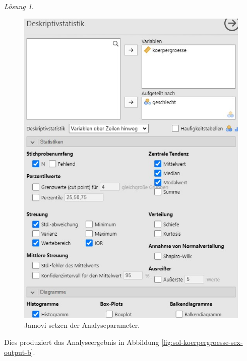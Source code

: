 \documentclass[
]{book}
\theoremstyle{definition}
\theoremstyle{definition}
\theoremstyle{definition}
\theoremstyle{definition}
\theoremstyle{remark}
\newtheorem*{solution}{Lösung}
\begin{document}
\begin{solution}
\begin{figure}
{\centering \includegraphics[width=1\linewidth]{figures/02-exr-koerpergroesse-sex-jmv-input-b} 

}

\caption{Jamovi setzen der Analyseparameter.}\label{fig:sol-koerpergroesse-sex-input-b}
\end{figure}

Dies produziert das Analyseergebnis in Abbildung \ref{fig:sol-koerpergroesse-sex-output-b}.

\begin{figure}


\end{figure}
\end{solution}
\end{document}
